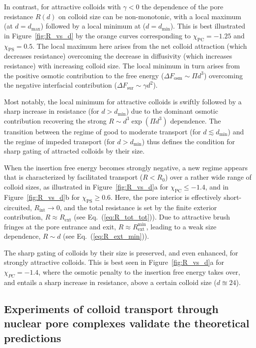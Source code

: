 \documentclass[12pt, a4paper]{article}
\begin{document}
In contrast, for attractive colloids with $\gamma <0$ the dependence of the pore resistance $R(d)$ on colloid size can be non-monotonic, with a local maximum (at $d=d_{\text{max}}$) followed by a local minimum at ($d=d_{\text{min}}$).
This is best illustrated in Figure~\ref{fig:R_vs_d} by the orange curves corresponding to $\chi_{\text{PC}} = -1.25$ and $\chi_{\text{PS}}=0.5$.
The local maximum here arises from the net colloid attraction (which decreases resistance) overcoming the decrease in diffusivity (which increases resistance) with increasing colloid size.
The local minimum in turn arises from the positive osmotic contribution to the free energy ($\Delta F_{\text{osm}} \sim \Pi d^3$) overcoming the negative interfacial contribution ($\Delta F_{\text{sur}} \sim \gamma d^2$).

Most notably, the local minimum for attractive colloids is swiftly followed by a sharp increase in resistance (for $d > d_{\text{min}}$) due to the dominant osmotic contribution recovering the strong $R \sim d^3 \exp(\Pi d^3)$ dependence.
The transition between the regime of good to moderate transport (for $d \lesssim d_{\text{min}}$) and the regime of impeded transport (for $d > d_{\text{min}}$) thus defines the condition for sharp gating of attracted colloids by their size.

When the insertion free energy becomes strongly negative, a new regime appears that is characterized by facilitated transport ($R < R_0$) over a rather wide range of colloid sizes, as illustrated in 
Figure~\ref{fig:R_vs_d}a for $\chi_{\text{PC}} \le -1.4$, and in Figure~\ref{fig:R_vs_d}b for $\chi_{\text{PS}} \ge 0.6$.
Here, the pore interior is effectively short-circuited, $R_{\text{int}} \to 0$, and the total resistance is set by the finite exterior contribution, $R \approx R_{\text{ext}}$ (see Eq.~(\ref{eq:R_tot_tot})).
Due to attractive brush fringes at the pore entrance and exit, $R \approx R_{\text{ext}}^{\text{min}}$, leading to a weak size dependence, $R \sim d$ (see Eq.~(\ref{eq:R_ext_min})).

The sharp gating of colloids by their size is preserved, and even enhanced, for strongly attractive colloids.
This is best seen in Figure~\ref{fig:R_vs_d}a for $\chi_{PC}= -1.4$, where the osmotic penalty to the insertion free energy takes over, and entails a sharp increase in resistance, above a certain colloid size ($d \approxeq 24$).


\subsection{Experiments of colloid transport through nuclear pore complexes validate the theoretical predictions}
\end{document}
